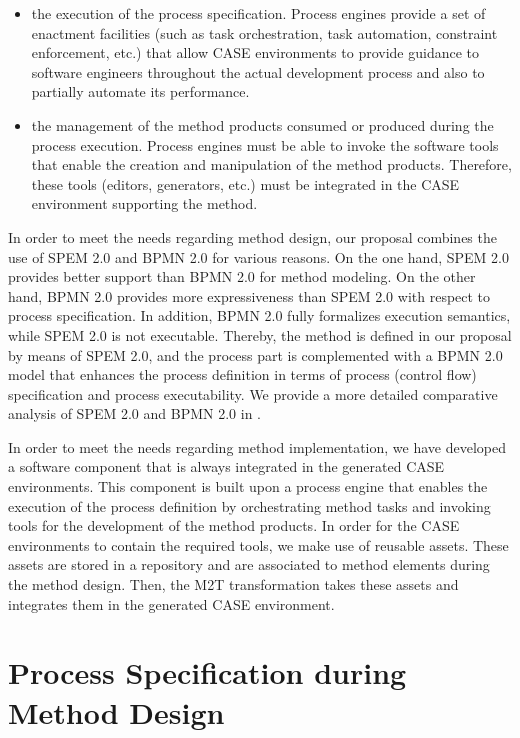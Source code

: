 \documentclass[runningheads,a4paper]{llncs}
\begin{document}
\begin{itemize}
  \item the execution of the process specification. Process engines provide a
  set of enactment facilities (such as task orchestration, task automation,
  constraint enforcement, etc.) that allow CASE environments to provide
  guidance to software engineers throughout the actual development process and
  also to partially automate its performance.
  
  \item the management of the method products consumed or produced during
  the process execution. Process engines must be able to invoke the software
  tools that enable the creation and manipulation of the method products.
  Therefore, these tools (editors, generators, etc.) must be integrated in the
  CASE environment supporting the method.
\end{itemize}

In order to meet the needs regarding method design, our proposal combines the
use of SPEM 2.0 and BPMN 2.0 for various reasons. On the one hand, SPEM 2.0
provides better support than BPMN 2.0 for method modeling. On the other hand,
BPMN 2.0 provides more expressiveness than SPEM 2.0 with respect to process
specification. In addition, BPMN 2.0 fully formalizes execution semantics, while
SPEM 2.0 is not executable. Thereby, the method is defined in our proposal by
means of SPEM 2.0, and the process part is complemented with a BPMN 2.0 model
that enhances the process definition in terms of process (control flow)
specification and process executability. We provide a more detailed comparative
analysis of SPEM 2.0 and BPMN 2.0 in \cite{Cervera12}.

In order to meet the needs regarding method implementation, we have developed a
software component that is always integrated in the generated CASE environments.
This component is built upon a process engine that enables the execution of the
process definition by orchestrating method tasks and invoking tools for the
development of the method products. In order for the CASE environments to
contain the required tools, we make use of reusable assets. These assets are
stored in a repository and are associated to method elements during the method
design. Then, the M2T transformation takes these assets and integrates them in
the generated CASE environment.

\section{Process Specification during Method Design}
\label{SectionMethodDesign}
\end{document}
